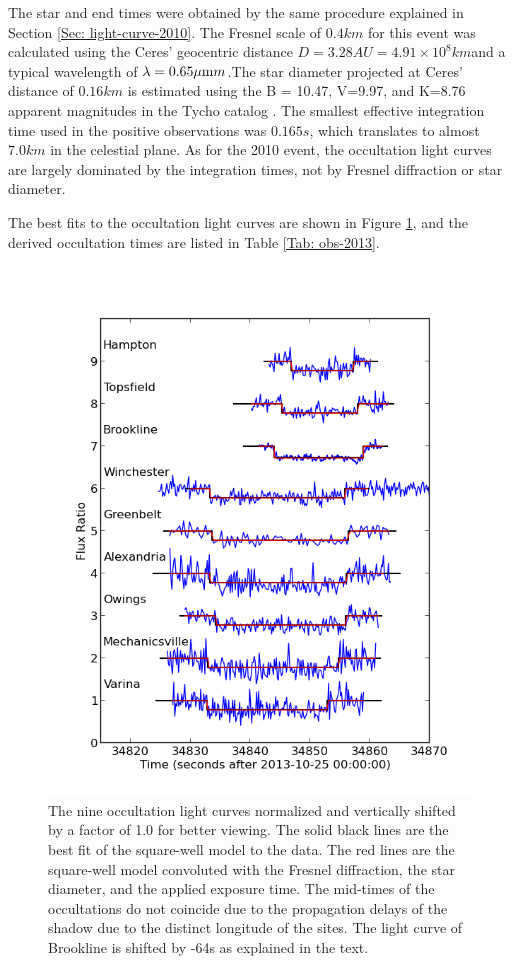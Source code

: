 \documentclass[useAMS,usenatbib]{mn2e}
\begin{document}
The star and end times were obtained by the same procedure explained in Section \ref{Sec: light-curve-2010}. The Fresnel scale of $0.4 km$ for this event was calculated using the Ceres’ geocentric distance $D = 3.28 AU = 4.91 \times 10^{8} km$and a typical wavelength of $\lambda = 0.65 \hbox{$\mu$m} m$.The star diameter projected at Ceres' distance of $0.16 km$ is estimated using the B = 10.47, V=9.97, and K=8.76 apparent magnitudes in the Tycho catalog \citep{Hog2000}. The smallest effective integration time used in the positive observations was $0.165 s$, which translates to almost $7.0 km$ in the celestial plane. As for the 2010 event, the occultation light curves are largely dominated by the integration times, not by Fresnel diffraction or star diameter.

The best fits to the occultation light curves are shown in Figure \ref{Fig: Ceres-2013-curves}, and the derived occultation times are listed in Table \ref{Tab: obs-2013}.

\begin{figure}
\includegraphics[scale=0.58]{figures/Ceres_2013_fluxratio} 
\caption{The nine occultation light curves normalized and vertically shifted by a factor of 1.0 for better viewing. The solid black lines are the best fit of the square-well model to the data. The red lines are the square-well model convoluted with the Fresnel diffraction, the star diameter, and the applied exposure time. The mid-times of the occultations do not coincide due to the propagation delays of the shadow due to the distinct longitude of the sites. The light curve of Brookline is shifted by -64s as explained in the text. \label{Fig: Ceres-2013-curves}}
\end{figure}
\end{document}
